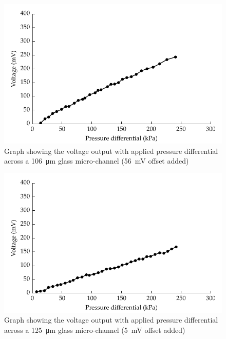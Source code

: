 \begin{figure}
    \centering
    \includegraphics{content/pt1/01-PowerHarvesting/graphics/streamingCell_voltVsPress_106um_out}
    \caption{\label{fig:VvsP_106um}Graph showing the voltage output with applied pressure differential across a \SI{106}{\micro\metre} glass micro-channel (\SI{56}{\milli\volt} offset added)}
\end{figure}

\begin{figure}
    \centering
    \includegraphics{content/pt1/01-PowerHarvesting/graphics/streamingCell_voltVsPress_125um_out}
    \caption{\label{fig:VvsP_125um}Graph showing the voltage output with applied pressure differential across a \SI{125}{\micro\metre} glass micro-channel (\SI{5}{\milli\volt} offset added)}
\end{figure}

